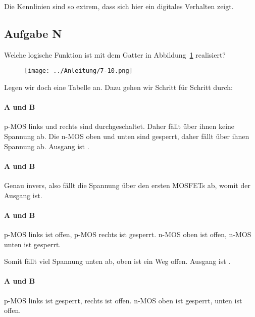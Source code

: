 Die Kennlinien sind so extrem, dass sich hier ein digitales Verhalten zeigt.

\FloatBarrier
\subsection{Aufgabe N}

\begin{problem}
	Welche logische Funktion ist mit dem Gatter in Abbildung~\ref{fig:7-10}
	realisiert?
\end{problem}

\begin{figure}[htbp]
	\centering
	\texttt{[image: ../Anleitung/7-10.png]}
	\caption{%
		\cite[Abbildung~7.10]{physik313-Anleitung}
	}
	\label{fig:7-10}
\end{figure}

Legen wir doch eine Tabelle an. Dazu gehen wir Schritt für Schritt durch:

\paragraph{A und B \tlow}

p-MOS links und rechts sind durchgeschaltet. Daher fällt über ihnen keine
Spannung ab. Die n-MOS oben und unten sind gesperrt, daher fällt über ihnen
Spannung ab. Ausgang ist \thigh.

\paragraph{A und B \thigh}

Genau invers, also fällt die Spannung über den ersten MOSFETs ab, womit der
Ausgang \tlow{} ist.

\paragraph{A \thigh{} und B \tlow}

p-MOS links ist offen, p-MOS rechts ist gesperrt. n-MOS oben ist offen, n-MOS
unten ist gesperrt.

Somit fällt viel Spannung unten ab, oben ist ein Weg offen. Ausgang ist \thigh.

\paragraph{A \tlow{} und B \thigh}

p-MOS links ist gesperrt, rechts ist offen. n-MOS oben ist gesperrt, unten ist
offen.

